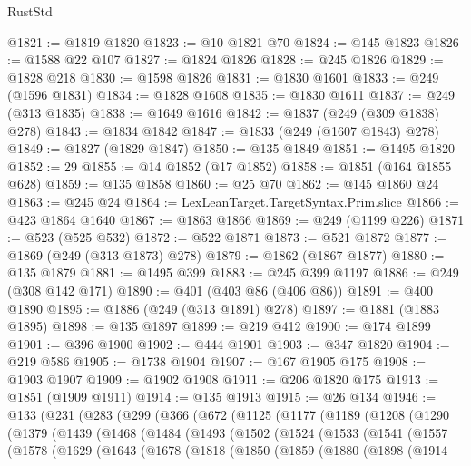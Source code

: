 \begin{lexlean}{RustStd}
\begin{coremodule}
@1821 := @1819 @1820
@1823 := @10 @1821 @70
@1824 := @145 @1823
@1826 := @1588 @22 @107
@1827 := @1824 @1826
@1828 := @245 @1826
@1829 := @1828 @218
@1830 := @1598 @1826
@1831 := @1830 @1601
@1833 := @249 (@1596 @1831)
@1834 := @1828 @1608
@1835 := @1830 @1611
@1837 := @249 (@313 @1835)
@1838 := @1649 @1616
@1842 := @1837 (@249 (@309 @1838) @278)
@1843 := @1834 @1842
@1847 := @1833 (@249 (@1607 @1843) @278)
@1849 := @1827 (@1829 @1847)
@1850 := @135 @1849
@1851 := @1495 @1820
@1852 := 29
@1855 := @14 @1852 (@17 @1852)
@1858 := @1851 (@164 @1855 @628)
@1859 := @135 @1858
@1860 := @25 @70
@1862 := @145 @1860 @24
@1863 := @245 @24
@1864 := LexLeanTarget.TargetSyntax.Prim.slice
@1866 := @423 @1864 @1640
@1867 := @1863 @1866
@1869 := @249 (@1199 @226)
@1871 := @523 (@525 @532)
@1872 := @522 @1871
@1873 := @521 @1872
@1877 := @1869 (@249 (@313 @1873) @278)
@1879 := @1862 (@1867 @1877)
@1880 := @135 @1879
@1881 := @1495 @399
@1883 := @245 @399 @1197
@1886 := @249 (@308 @142 @171)
@1890 := @401 (@403 @86 (@406 @86))
@1891 := @400 @1890
@1895 := @1886 (@249 (@313 @1891) @278)
@1897 := @1881 (@1883 @1895)
@1898 := @135 @1897
@1899 := @219 @412
@1900 := @174 @1899
@1901 := @396 @1900
@1902 := @444 @1901
@1903 := @347 @1820
@1904 := @219 @586
@1905 := @1738 @1904
@1907 := @167 @1905 @175
@1908 := @1903 @1907
@1909 := @1902 @1908
@1911 := @206 @1820 @175
@1913 := @1851 (@1909 @1911)
@1914 := @135 @1913
@1915 := @26 @134
@1946 := @133
    (@231
      (@283
        (@299
          (@366
            (@672
              (@1125
                (@1177
                  (@1189
                    (@1208
                      (@1290
                        (@1379
                          (@1439
                            (@1468
                              (@1484
                                (@1493
                                  (@1502
                                    (@1524
                                      (@1533
                                        (@1541
                                          (@1557
                                            (@1578
                                              (@1629
                                                (@1643
                                                  (@1678
                                                    (@1818
                                                      (@1850
                                                        (@1859
                                                          (@1880
                                                            (@1898
                                                              (@1914

\end{coremodule}
\end{lexlean}
